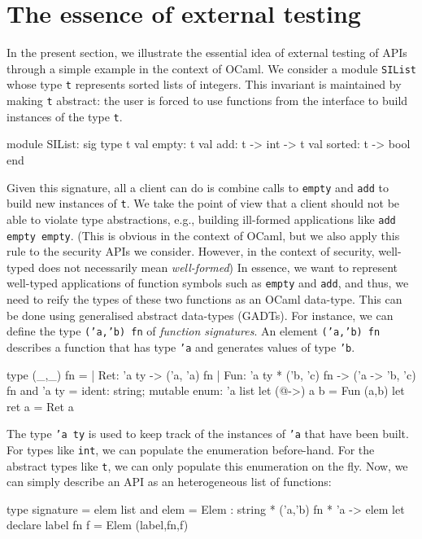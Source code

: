 \documentclass[twocolumn,9pt,a4paper]{easychair}
\newcommand{\code}[1]{\texttt{#1}}
\begin{document}
\section{The essence of external testing}\label{sec:example}
In the present section, we illustrate the essential idea of external
testing of APIs through a simple example in the context of OCaml. We
consider a module \code{SIList} whose type \code{t} represents sorted
lists of integers. This invariant is maintained by making \code{t}
abstract: the user is forced to use functions from the interface to
build instances of the type \code{t}.
\begin{ocamlcode}
module SIList: sig
  type t
  val empty: t
  val add: t -> int -> t
  val sorted: t -> bool
end
\end{ocamlcode}
Given this signature, all a client can do is combine calls to
\code{empty} and \code{add} to build new instances of \code{t}. We
take the point of view that a client should not be able to violate
type abstractions, e.g., building ill-formed applications like
\code{add empty empty}. (This is obvious in the context of OCaml, but
we also apply this rule to the security APIs we consider. However, in
the context of security, well-typed does not necessarily mean
\emph{well-formed})
%
In essence, we want to represent well-typed applications of function
symbols such as \code{empty} and \code{add}, and thus, we need to
reify the types of these two functions as an OCaml data-type. This can
be done using generalised abstract data-types (GADTs). For instance,
we can define the type \code{('a,'b) fn} of \emph{function
  signatures}.  An element \code{('a,'b) fn} describes a function that
has type \code{'a} and generates values of type \code{'b}.
\begin{ocamlcode}
type (_,_) fn =
| Ret: 'a ty -> ('a, 'a) fn
| Fun: 'a ty *  ('b, 'c) fn -> ('a -> 'b, 'c) fn
and 'a ty = {ident: string; mutable enum: 'a list}
let (@->) a b = Fun (a,b)
let ret a = Ret a
\end{ocamlcode}
The type \code{'a ty} is used to keep track of the instances of
\code{'a} that have been built. For types like \code{int}, we can
populate the enumeration before-hand. For the abstract types like
\code{t}, we can only populate this enumeration on the fly. Now, we
can simply describe an API as an heterogeneous list of functions:
\begin{ocamlcode}
type signature = elem list
and  elem =
  Elem : string * ('a,'b) fn * 'a -> elem
let declare label fn f = Elem (label,fn,f)
\end{ocamlcode}
\end{document}
